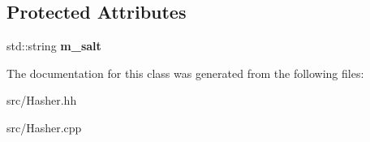 \subsection*{Protected Attributes}
\begin{DoxyCompactItemize}
\item 
\hypertarget{classstb_1_1Hasher_a1f479ab7102a6becde71532799503823}{std\+::string {\bfseries m\+\_\+salt}}\label{classstb_1_1Hasher_a1f479ab7102a6becde71532799503823}

\end{DoxyCompactItemize}


The documentation for this class was generated from the following files\+:\begin{DoxyCompactItemize}
\item 
src/Hasher.\+hh\item 
src/Hasher.\+cpp\end{DoxyCompactItemize}
